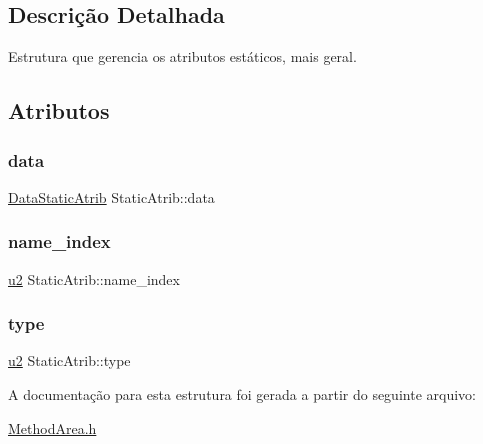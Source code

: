 \subsection{Descrição Detalhada}
Estrutura que gerencia os atributos estáticos, mais geral. 

\subsection{Atributos}
\mbox{\label{structStaticAtrib_aa9c612ef7f4696833d6658c21691b048}} 
\subsubsection{\texorpdfstring{data}{data}}
{\footnotesize\ttfamily \hyperlink{unionDataStaticAtrib}{Data\+Static\+Atrib} Static\+Atrib\+::data}

\mbox{\label{structStaticAtrib_a7066a25332e32a5d8eccc92d8b303635}} 
\subsubsection{\texorpdfstring{name\+\_\+index}{name\_index}}
{\footnotesize\ttfamily \hyperlink{ClassLoader_8h_a5f223212eef04d10a4550ded680cb1cf}{u2} Static\+Atrib\+::name\+\_\+index}

\mbox{\label{structStaticAtrib_ace3f941daa9df10a76029562b3f9cef3}} 
\subsubsection{\texorpdfstring{type}{type}}
{\footnotesize\ttfamily \hyperlink{ClassLoader_8h_a5f223212eef04d10a4550ded680cb1cf}{u2} Static\+Atrib\+::type}



A documentação para esta estrutura foi gerada a partir do seguinte arquivo\+:\begin{DoxyCompactItemize}
\item 
\hyperlink{MethodArea_8h}{Method\+Area.\+h}\end{DoxyCompactItemize}
